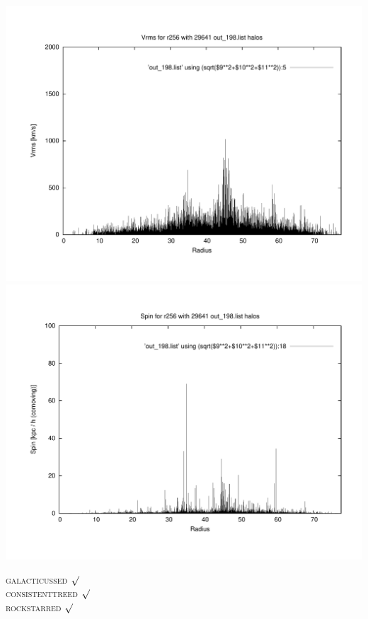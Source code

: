 \includegraphics[scale=0.3]{r256/stages_51/plot_Vrms_out_198.pdf}
\includegraphics[scale=0.3]{r256/stages_51/plot_spin_out_198.pdf}

\textsc{galacticussed} $\surd$ \\
\textsc{consistenttreed} $\surd$ \\ 
\textsc{rockstarred} $\surd$


% 
%
%
%
%
%
%
%


\newpage
